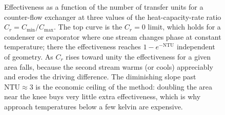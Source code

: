 \begin{figure}[htbp]
\centering
{}
\caption[Effectiveness versus NTU for counter-flow]{Effectiveness as a function
of the number of transfer units for a counter-flow exchanger at three values of
the heat-capacity-rate ratio $C_r=C_{\min}/C_{\max}$. The top curve is the
$C_r=0$ limit, which holds for a condenser or evaporator where one stream changes
phase at constant temperature; there the effectiveness reaches $1-e^{-\mathrm{NTU}}$
independent of geometry. As $C_r$ rises toward unity the effectiveness for a
given area falls, because the second stream warms (or cools) appreciably and
erodes the driving difference. The diminishing slope past $\mathrm{NTU}\approx 3$
is the economic ceiling of the method: doubling the area near the knee buys very
little extra effectiveness, which is why approach temperatures below a few kelvin
are expensive.}
\label{fig:vol04ch06:effectiveness-ntu}
\end{figure}
